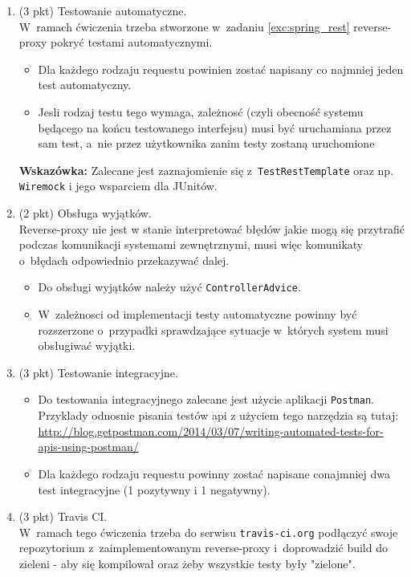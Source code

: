 \documentclass[12pt]{article}
\begin{document}
\begin{enumerate}
        \item\label{exc:spring_rest_test}
            (3 pkt) Testowanie automatyczne.\\
W~ramach ćwiczenia trzeba stworzone w~zadaniu \ref{exc:spring_rest} reverse-proxy pokryć testami automatycznymi.
\begin{itemize}
        \item Dla każdego rodzaju requestu powinien zostać napisany co najmniej jeden test automatyczny.
        \item Jesli rodzaj testu tego wymaga, zależnosć (czyli obecność systemu będącego na końcu testowanego interfejsu) musi być uruchamiana przez sam test, a~nie przez użytkownika zanim testy zostaną uruchomione
\end{itemize}

\textbf{Wskazówka:} Zalecane jest zaznajomienie się z~\texttt{TestRestTemplate} oraz np. \texttt{Wiremock} i jego wsparciem dla JUnitów.

        \item\label{exc:spring_exception_handling}
            (2 pkt) Obsługa wyjątków.\\
Reverse-proxy nie jest w stanie interpretować błędów jakie mogą się przytrafić podczas komunikacji systemami zewnętrznymi, musi więc komunikaty o~błędach odpowiednio przekazywać dalej.
\begin{itemize}
        \item Do obsługi wyjątków należy użyć \texttt{ControllerAdvice}.
        \item W~zależnosci od implementacji testy automatyczne powinny być rozszerzone o~przypadki sprawdzające sytuacje w~których system musi obsługiwać wyjątki.
\end{itemize}

        \item\label{exc:postman}
            (3 pkt) Testowanie integracyjne.\\
\begin{itemize}
        \item Do testowania integracyjnego zalecane jest użycie aplikacji \texttt{Postman}. Przyklady odnosnie pisania testów api z użyciem tego narzędzia są tutaj: \\\url{http://blog.getpostman.com/2014/03/07/writing-automated-tests-for-apis-using-postman/}
        \item Dla każdego rodzaju requestu powinny zostać napisane conajmniej dwa test integracyjne (1 pozytywny i 1 negatywny).
\end{itemize}

        \item\label{exc:travis}
            (3 pkt) Travis CI.\\
W~ramach tego ćwiczenia trzeba do serwisu \texttt{travis-ci.org} podłączyć swoje repozytorium z~zaimplementowanym reverse-proxy i~doprowadzić build do zieleni - aby się kompilował oraz żeby wszystkie testy były "zielone".

    \end{enumerate}
\end{document}
